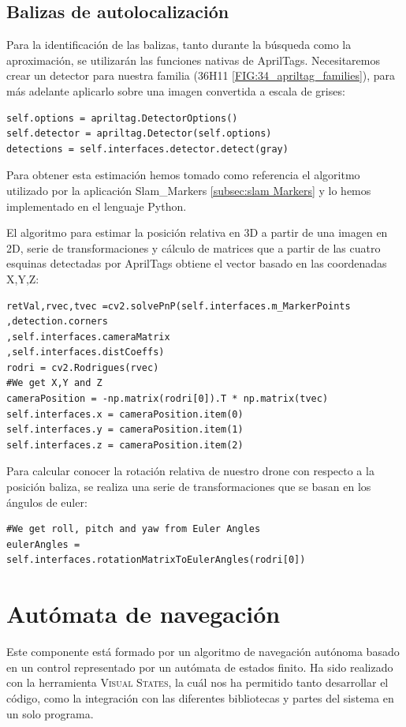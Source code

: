 \subsection{Balizas de autolocalización}

Para la identificación de las balizas, tanto durante la búsqueda como la aproximación, se utilizarán las funciones nativas de AprilTags. Necesitaremos crear un detector para nuestra familia (36H11 \ref{FIG:34_apriltag_families}), para más adelante aplicarlo sobre una imagen convertida a escala de grises:

\begin{lstlisting}[backgroundcolor=\color{gray!15}]
self.options = apriltag.DetectorOptions()
self.detector = apriltag.Detector(self.options)
detections = self.interfaces.detector.detect(gray)
\end{lstlisting}

Para obtener esta estimación hemos tomado como referencia el algoritmo utilizado por la aplicación Slam\_Markers \ref{subsec:slam Markers} y lo hemos implementado en el lenguaje Python.

El algoritmo para estimar la posición relativa en 3D a partir de una imagen en 2D, serie de transformaciones y cálculo de matrices que a partir de las cuatro esquinas detectadas por AprilTags obtiene el vector basado en las coordenadas X,Y,Z:

\begin{lstlisting}[backgroundcolor=\color{gray!15}]
retVal,rvec,tvec =cv2.solvePnP(self.interfaces.m_MarkerPoints
,detection.corners
,self.interfaces.cameraMatrix
,self.interfaces.distCoeffs)
rodri = cv2.Rodrigues(rvec)
#We get X,Y and Z
cameraPosition = -np.matrix(rodri[0]).T * np.matrix(tvec) 
self.interfaces.x = cameraPosition.item(0)
self.interfaces.y = cameraPosition.item(1)
self.interfaces.z = cameraPosition.item(2)
\end{lstlisting}

Para calcular conocer la rotación relativa de nuestro drone con respecto a la posición baliza, se realiza una serie de transformaciones que se basan en los ángulos de euler:

\begin{lstlisting}[backgroundcolor=\color{gray!15}]
#We get roll, pitch and yaw from Euler Angles        
eulerAngles = 
self.interfaces.rotationMatrixToEulerAngles(rodri[0])
\end{lstlisting}

\section{Autómata de navegación} 
\label{sec:3Dpathfollow}
Este componente está formado por un algoritmo de navegación autónoma basado en un control representado por un autómata de estados finito. Ha sido realizado con la herramienta \textsc{Visual States}, la cuál nos ha permitido tanto desarrollar el código, como la integración con las diferentes bibliotecas y partes del sistema en un solo programa.

